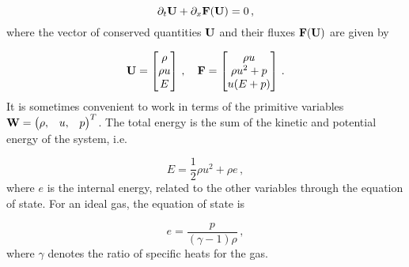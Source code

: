\documentclass[final,3p,twocolumn,times]{elsarticle}
\begin{document}
\begin{equation}
    \partial_t {\bf U} + \partial_x {\bf F(U)} = 0\,,
    \label{eq:euler}
\end{equation}
%
where the vector of conserved quantities ${\bf U}$ and their fluxes ${\bf F(U)}$ are given by

\begin{equation*}
    {\bf U} = 
    \begin{bmatrix} 
        \rho \\ 
        \rho u \\ 
        E 
    \end{bmatrix}
    \,,\quad
    {\bf F} = 
    \begin{bmatrix}
        \rho u \\ 
        \rho u^2 + p \\
        u(E+p) 
    \end{bmatrix}
    \,.
\end{equation*}
%
It is sometimes convenient to work in terms of the primitive variables ${\bf W} =
\begin{pmatrix} \rho, & u, & p \end{pmatrix}^T$. The total energy is the sum of
the kinetic and potential energy of the system, i.e.~ 

\begin{equation}
    E = \frac{1}{2} \rho u^2 + \rho e \,,
    \label{eq:energy}
\end{equation}
%
where $e$ is the internal energy, related to the other variables through the
equation of state. For an ideal gas, the equation of state is 

\begin{equation}
     e = \frac{p}{(\gamma-1)\rho} \,,
     \label{eq:EoS}
 \end{equation}
%
where $\gamma$ denotes the ratio of specific heats for the gas. 
\end{document}
